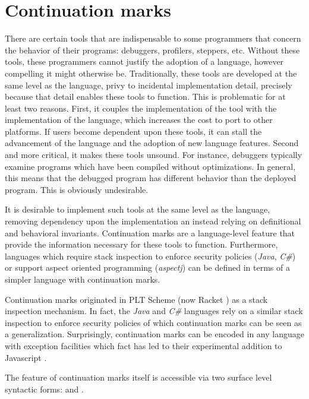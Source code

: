 \documentclass[ms,electronic,twosidetoc,letterpaper,chaptercenter,parttop]{byumsphd}
\begin{document}
\chapter{Continuation marks}

There are certain tools that are indispensable to some programmers that concern the
behavior of their programs: debuggers, profilers, steppers, etc. Without these tools,
these programmers cannot justify the adoption of a language, however compelling it might
otherwise be. Traditionally, these tools are developed at the same level as the 
language, privy to incidental implementation detail, precisely because that detail 
enables these tools to function. This is problematic for at least two reasons. First, 
it couples the implementation of the tool with the implementation of the language, which
increases the cost to port to other platforms. If users become dependent upon these tools,
it can stall the advancement of the language and the adoption of new language features.
Second and more critical, it makes these tools unsound. For instance, debuggers typically
examine programs which have been compiled without optimizations. In general, this means 
that the debugged program has different behavior than the deployed program. This is 
obviously undesirable.

It is desirable to implement such tools at the same level as the language, removing
dependency upon the implementation an instead relying on definitional and behavioral
invariants. Continuation marks are a language-level feature that provide the information
necessary for these tools to function. Furthermore, languages which require stack
inspection to enforce security policies (\emph{Java}, \emph{C\#}) or support aspect
oriented programming (\emph{aspectj}) can be defined in terms of a simpler language with
continuation marks.

Continuation marks originated in PLT Scheme (now Racket \cite{plt-tr1}) as a stack 
inspection mechanism. In fact, the \emph{Java} and \emph{C\#} languages rely on a similar 
stack inspection to enforce security policies of which continuation marks can be seen as 
a generalization. Surprisingly, continuation marks can be encoded in any language with 
exception facilities \cite{pettyjohn2005continuations} which fact has led to their 
experimental addition to Javascript \cite{clements2008implementing}.

The feature of continuation marks itself is accessible via two surface level syntactic
forms:  and .
\end{document}
